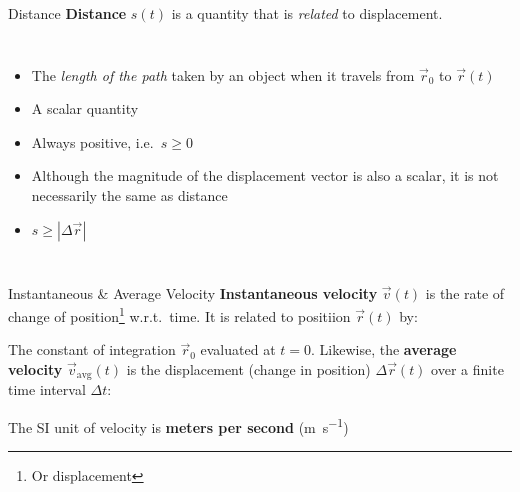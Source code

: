 \documentclass[12pt,compress,aspectratio=169,dvipsnames]{beamer}
\begin{document}
\begin{frame}{Distance}
  \textbf{Distance} $s(t)$ is a quantity that is \emph{related} to displacement.
  \begin{columns}
    \begin{itemize}
    \item The \emph{length of the path} taken by an object when it travels from
      $\vec r_0$ to $\vec r(t)$
    \item A scalar quantity
    \item Always positive, i.e.\ $s\geq 0$
    \item Although the magnitude of the displacement vector is also a scalar,
      it is not necessarily the same as distance
    \item $s\geq |\Delta\vec r|$
    \end{itemize}
    
  \end{columns}
\end{frame}



\begin{frame}{Instantaneous \& Average Velocity}
  \textbf{Instantaneous velocity} $\vec v(t)$ is the rate of change of
  position\footnote{Or displacement} w.r.t.\ time. It is related to positiion
  $\vec r(t)$ by:


  The constant of integration $\vec r_0$ evaluated at $t=0$. Likewise, the
  \textbf{average velocity} $\vec v_\text{avg}(t)$ is the displacement (change
  in position) $\Delta\vec r(t)$ over a finite time interval $\Delta t$:


  The SI unit of velocity is \textbf{meters per second} (\si{\metre\per\second})
  \vspace{.2in}
\end{frame}
\end{document}

